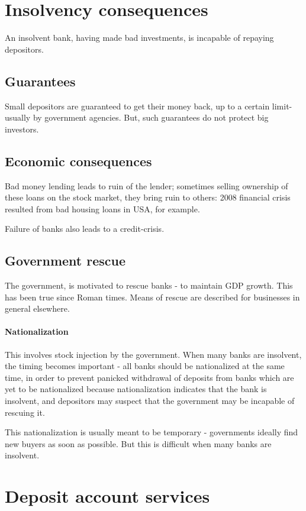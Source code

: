 \documentclass[oneside, article]{memoir}
\begin{document}
\section{Insolvency consequences}
An insolvent bank, having made bad investments, is incapable of repaying depositors.

\subsection{Guarantees}
Small depositors are guaranteed to get their money back, up to a certain limit- usually by government agencies.  But, such guarantees do not protect big investors.

\subsection{Economic consequences}
Bad money lending leads to ruin of the lender; sometimes selling ownership of these loans on the stock market, they bring ruin to others: 2008 financial crisis resulted from bad housing loans in USA, for example.

Failure of banks also leads to a credit-crisis.

\subsection{Government rescue}
The government, is motivated to rescue banks - to maintain GDP growth. This has been true since Roman times. Means of rescue are described for businesses in general elsewhere.

\paragraph{Nationalization}
This involves stock injection by the government. When many banks are insolvent, the timing becomes important - all banks should be nationalized at the same time, in order to prevent panicked withdrawal of deposits from banks which are yet to be nationalized because nationalization indicates that the bank is insolvent, and depositors may suspect that the government may be incapable of rescuing it.

This nationalization is usually meant to be temporary - governments ideally find new buyers as soon as possible. But this is difficult when many banks are insolvent.

\section{Deposit account services}
\end{document}
